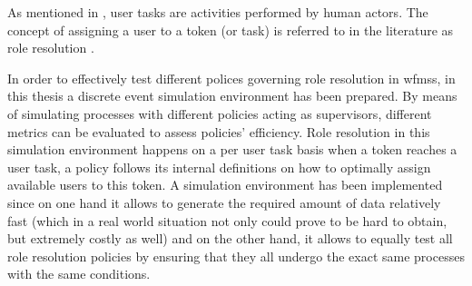 As mentioned in , user tasks are activities performed by human actors. The concept of assigning a user to a token (or task) is referred to in the literature as role resolution \citep{Zeng2005,Cheng2000}. 

In order to effectively test different polices governing role resolution in \glspl{wfms}, in this thesis a discrete event simulation environment has been prepared. By means of simulating processes with different policies acting as supervisors, different metrics can be evaluated to assess policies' efficiency. Role resolution in this simulation environment happens on a per user task basis \ie when a token reaches a user task, a policy follows its internal definitions on how to optimally assign available users to this token. A simulation environment has been implemented since on one hand it allows to generate the required amount of data relatively fast (which in a real world situation not only could prove to be hard to obtain, but extremely costly as well) and on the other hand, it allows to equally test all role resolution policies by ensuring that they all undergo the exact same processes with the same conditions.